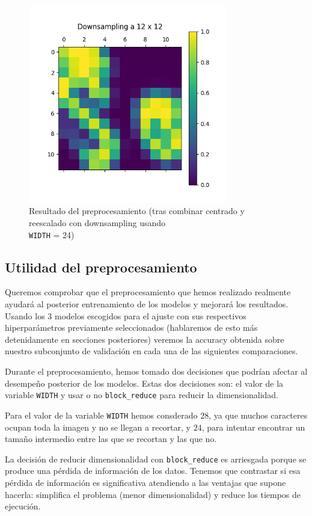 \documentclass[a4]{article}
\begin{document}
\begin{figure}[H]
  \centering
  \includegraphics[width=87mm]{imgs/downsampling.png}
  \caption{Resultado del preprocesamiento (tras combinar centrado y reescalado con downsampling usando\\ \texttt{WIDTH} = 24)}
  \label{fig:downsampling}
\end{figure}

\subsection{Utilidad del preprocesamiento}

Queremos comprobar que el preprocesamiento que hemos realizado
realmente ayudará al posterior entrenamiento de los modelos y mejorará
los resultados. Usando los 3 modelos escogidos para el ajuste con sus
respectivos hiperparámetros previamente seleccionados (hablaremos de
esto más detenidamente en secciones posteriores) veremos la accuracy
obtenida sobre nuestro subconjunto de validación en cada una de las
siguientes comparaciones.

Durante el preprocesamiento, hemos tomado dos decisiones que podrían
afectar al desempeño posterior de los modelos. Estas dos decisiones
son: el valor de la variable \texttt{WIDTH} y usar o no
\texttt{block\_reduce} para reducir la dimensionalidad.

Para el valor de la variable \texttt{WIDTH} hemos consderado $28$, ya
que muchos caracteres ocupan toda la imagen y no se llegan a recortar,
y $24$, para intentar encontrar un tamaño intermedio entre las que se
recortan y las que no.

La decisión de reducir dimensionalidad con \texttt{block\_reduce} es
arriesgada porque se produce una pérdida de información de los
datos. Tenemos que contrastar si esa pérdida de información es
significativa atendiendo a las ventajas que supone hacerla: simplifica
el problema (menor dimensionalidad) y reduce los tiempos de ejecución.
\end{document}
